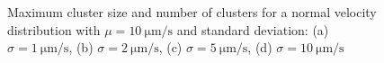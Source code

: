 \documentclass[../../master_thesis_np.tex]{subfiles}
\begin{document}
		\begin{figure}[htp]
			\centering\
			\\
			\\
			
			\caption{Maximum cluster size and number of clusters for a normal velocity distribution with $\mu = \SI{10}{\um\per\second}$ and standard deviation: (a) $\sigma = \SI{1}{\um\per\second}$, (b) $\sigma = \SI{2}{\um\per\second}$, (c) $\sigma = \SI{5}{\um\per\second}$, (d) $\sigma = \SI{10}{\um\per\second}$}
			\label{fig:lj_vdist_clust}
		\end{figure}
		
\end{document}
